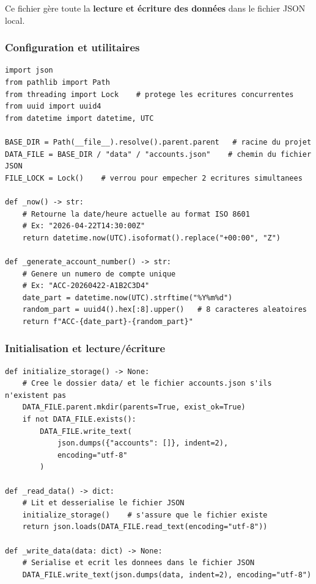 \documentclass[12pt,a4paper]{article}
\begin{document}
Ce fichier gère toute la \textbf{lecture et écriture des données} dans le fichier JSON local.

\subsubsection{Configuration et utilitaires}

\begin{lstlisting}[style=python, caption={storage.py — Configuration}]
import json
from pathlib import Path
from threading import Lock    # protege les ecritures concurrentes
from uuid import uuid4
from datetime import datetime, UTC

BASE_DIR = Path(__file__).resolve().parent.parent   # racine du projet
DATA_FILE = BASE_DIR / "data" / "accounts.json"    # chemin du fichier JSON
FILE_LOCK = Lock()    # verrou pour empecher 2 ecritures simultanees

def _now() -> str:
    # Retourne la date/heure actuelle au format ISO 8601
    # Ex: "2026-04-22T14:30:00Z"
    return datetime.now(UTC).isoformat().replace("+00:00", "Z")

def _generate_account_number() -> str:
    # Genere un numero de compte unique
    # Ex: "ACC-20260422-A1B2C3D4"
    date_part = datetime.now(UTC).strftime("%Y%m%d")
    random_part = uuid4().hex[:8].upper()   # 8 caracteres aleatoires
    return f"ACC-{date_part}-{random_part}"
\end{lstlisting}

\subsubsection{Initialisation et lecture/écriture}

\begin{lstlisting}[style=python, caption={storage.py — Lecture et ecriture}]
def initialize_storage() -> None:
    # Cree le dossier data/ et le fichier accounts.json s'ils n'existent pas
    DATA_FILE.parent.mkdir(parents=True, exist_ok=True)
    if not DATA_FILE.exists():
        DATA_FILE.write_text(
            json.dumps({"accounts": []}, indent=2),
            encoding="utf-8"
        )

def _read_data() -> dict:
    # Lit et desserialise le fichier JSON
    initialize_storage()    # s'assure que le fichier existe
    return json.loads(DATA_FILE.read_text(encoding="utf-8"))

def _write_data(data: dict) -> None:
    # Serialise et ecrit les donnees dans le fichier JSON
    DATA_FILE.write_text(json.dumps(data, indent=2), encoding="utf-8")
\end{lstlisting}
\end{document}
